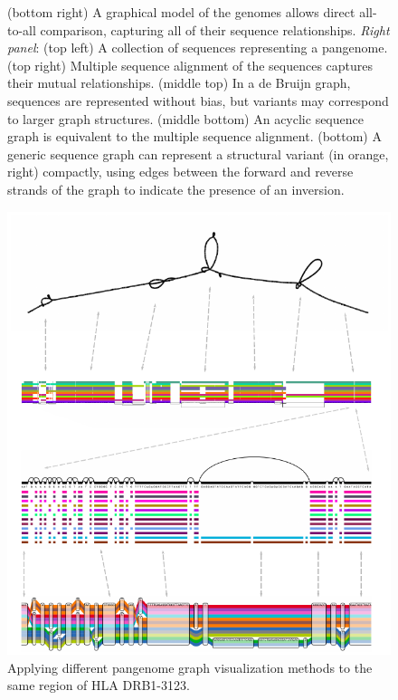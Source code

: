 \begin{figure}[p]
{    (bottom right) A graphical model of the genomes allows direct all-to-all comparison, capturing all of their sequence relationships.
    \emph{Right panel}:
    (top left) A collection of sequences representing a pangenome.
    (top right) Multiple sequence alignment of the sequences captures their mutual relationships.
    (middle top) In a de Bruijn graph, sequences are represented without bias, but variants may correspond to larger graph structures.
    (middle bottom) An acyclic sequence graph is equivalent to the multiple sequence alignment.
    (bottom) A generic sequence graph can represent a structural variant (in orange, right) compactly, using edges between the forward and reverse strands of the graph to indicate the presence of an inversion.
  }
\end{figure}

\begin{figure}[p]
  \begin{minipage}[c]{0.67\textwidth}
    \includegraphics[width=\textwidth]{figures/fig2viz.pdf}
  \end{minipage}\hfill
  \begin{minipage}[c]{0.3\textwidth}
    \caption{
      Applying different pangenome graph visualization methods to the same region of HLA DRB1-3123.
    } \label{fig:visualization}
  \end{minipage}
\end{figure}

